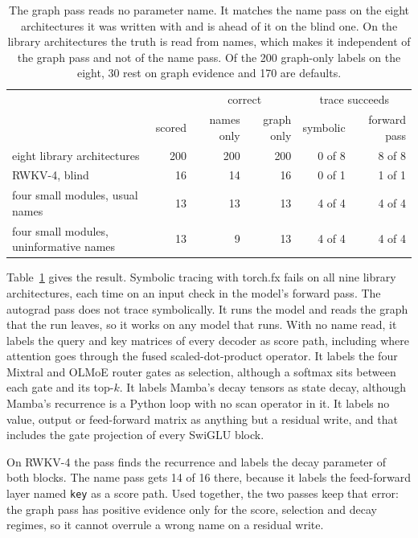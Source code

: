 \documentclass[journal,onecolumn]{IEEEtran}
\begin{document}
\begin{table}[h]
\centering
\caption{The graph pass reads no parameter name. It matches the name pass on the eight
architectures it was written with and is ahead of it on the blind one. On the library
architectures the truth is read from names, which makes it independent of the graph pass and not
of the name pass. Of the 200 graph-only labels on the eight, 30 rest on graph evidence and 170
are defaults.}
\label{tab:tracer}
\small
\begin{tabular}{lrrrrr}
\toprule
 & & \multicolumn{2}{c}{correct} & \multicolumn{2}{c}{trace succeeds} \\
 & scored & names only & graph only & symbolic & forward pass \\
\midrule
eight library architectures & 200 & 200 & 200 & 0 of 8 & 8 of 8 \\
RWKV-4, blind & 16 & 14 & 16 & 0 of 1 & 1 of 1 \\
four small modules, usual names & 13 & 13 & 13 & 4 of 4 & 4 of 4 \\
four small modules, uninformative names & 13 & 9 & 13 & 4 of 4 & 4 of 4 \\
\bottomrule
\end{tabular}
\end{table}

Table~\ref{tab:tracer} gives the result. Symbolic tracing with torch.fx fails on all nine library
architectures, each time on an input check in the model's forward pass. The autograd pass does
not trace symbolically. It runs the model and reads the graph that the run leaves, so it works on
any model that runs. With no name read, it labels the query and key matrices of every decoder as
score path, including where attention goes through the fused scaled-dot-product operator. It
labels the four Mixtral and OLMoE router gates as selection, although a softmax sits between
each gate and its top-$k$. It labels Mamba's decay tensors as state decay, although Mamba's
recurrence is a Python loop with no scan operator in it. It labels no value, output or
feed-forward matrix as anything but a residual write, and that includes the gate projection of
every SwiGLU block.

On RWKV-4 the pass finds the recurrence and labels the decay parameter of both blocks. The name
pass gets 14 of 16 there, because it labels the feed-forward layer named \texttt{key} as a score
path. Used together, the two passes keep that error: the graph pass has positive evidence only
for the score, selection and decay regimes, so it cannot overrule a wrong name on a residual
write.
\end{document}
